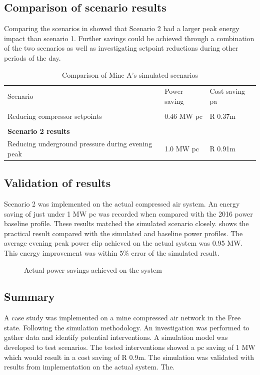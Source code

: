 \subsection{Comparison of scenario results}
Comparing the scenarios in  showed that Scenario 2 had a larger peak energy impact than scenario 1. Further savings could be achieved through a combination of the two scenarios as well as investigating setpoint reductions during other periods of the day.
\begin{table}[h!]
	\centering
	\begin{tabular}{p{}
			p{}
			p{}}
		\hline 
		Scenario & Power saving & Cost saving \gls{pa} \\
		\hhline{===} 
		\multicolumn{3}{l}{\textbf{Scenario 1 results}} \\
		Reducing compressor setpoints & $ 0.46 $ MW \gls{pc} & R 0.37m \\
		\\
		\multicolumn{3}{l}{\textbf{Scenario 2 results}} \\
		Reducing underground pressure during evening peak& 1.0 MW \gls{pc} & R 0.91m\\
		\hline
	\end{tabular}
	\caption{Comparison of Mine A's simulated scenarios}
	\label{Table: A Comparison}
\end{table}

\subsection{Validation of results}
Scenario 2 was implemented on the actual compressed air system. An energy saving of just under 1 MW \gls{pc} was recorded when compared with the 2016 power baseline profile. These results matched the simulated scenario closely.  shows the practical result compared with the simulated and baseline power profiles. The average evening peak power clip achieved on the actual system was 0.95 MW. This energy improvement was within 5\% error of the simulated result.
\begin{figure}[h!]
	\centering
	
	\caption{Actual power savings achieved on the system}
	\label{fig: Actual permormance beet}
\end{figure}
\subsection{Summary}
A case study was implemented on a mine compressed air network in the Free state. Following the simulation methodology. An investigation was performed to gather data and identify potential interventions. A simulation model was developed to test scenarios. The tested interventions showed a \gls{pc} saving of 1 MW which would result in a cost saving of R 0.9m. The simulation was validated with results from implementation on the actual system. The.
